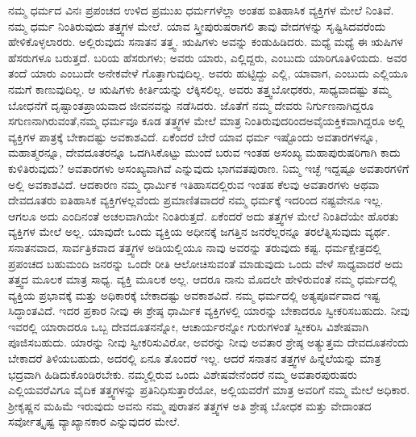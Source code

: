 ನಮ್ಮ ಧರ್ಮದ ವಿನಃ ಪ್ರಪಂಚದ ಉಳಿದ ಪ್ರಮುಖ ಧರ್ಮಗಳೆಲ್ಲಾ ಅಂತಹ ಐತಿಹಾಸಿಕ ವ್ಯಕ್ತಿಗಳ ಮೇಲೆ ನಿಂತಿವೆ. ನಮ್ಮ ಧರ್ಮ ನಿಂತಿರುವುದು ತತ್ತ್ವಗಳ ಮೇಲೆ. ಯಾವ ಸ್ತ್ರೀಪುರುಷರಾಗಲಿ ತಾವು ವೇದಗಳನ್ನು ಸೃಷ್ಟಿಸಿದವರೆಂದು ಹೇಳಿಕೊಳ್ಳಲಾರರು. ಅಲ್ಲಿರುವುದು ಸನಾತನ ತತ್ತ್ವ. ಋಷಿಗಳು ಅವನ್ನು ಕಂಡುಹಿಡಿದರು. ಮಧ್ಯೆ ಮಧ್ಯೆ ಈ ಋಷಿಗಳ ಹೆಸರುಗಳೂ ಬರುತ್ತದೆ. ಬರಿಯ ಹೆಸರುಗಳು; ಅವರು ಯಾರು, ಎಲ್ಲಿದ್ದರು, ಎಂಬುದು ಯಾರಿಗೂ\break ತಿಳಿಯದು. ಅವರ ತಂದೆ ಯಾರು ಎಂಬುದೇ ಅನೇಕವೇಳೆ ಗೊತ್ತಾಗುವುದಿಲ್ಲ. ಅವರು ಹುಟ್ಟಿದ್ದು ಎಲ್ಲಿ, ಯಾವಾಗ, ಎಂಬುದು ಎಲ್ಲಿಯೂ ನಮಗೆ ಕಾಣುವುದಿಲ್ಲ. ಆ ಋಷಿಗಳು ಕೀರ್ತಿಯನ್ನು ಲೆಕ್ಕಿಸಲಿಲ್ಲ. ಅವರು ತತ್ತ್ವಬೋಧಕರು, ಸಾಧ್ಯವಾದಷ್ಟು ತಮ್ಮ ಬೋಧನೆಗೆ ದೃಷ್ಟಾಂತಪ್ರಾಯವಾದ ಜೀವನವನ್ನು ನಡೆಸಿದರು. ಜೊತೆಗೆ ನಮ್ಮ ದೇವರು ನಿರ್ಗುಣನಾಗಿದ್ದರೂ ಸಗುಣನಾಗಿರುವಂತೆ,\break ನಮ್ಮ ಧರ್ಮವೂ ಕೂಡ ತತ್ತ್ವಗಳ ಮೇಲೆ ಮಾತ್ರ ನಿಂತಿರುವುದರಿಂದ\break ಅವೈಯಕ್ತಿಕವಾಗಿದ್ದರೂ ಅಲ್ಲಿ ವ್ಯಕ್ತಿಗಳ ಪಾತ್ರಕ್ಕೆ ಬೇಕಾದಷ್ಟು ಅವಕಾಶವಿದೆ. ಏಕೆಂದರೆ ಬೇರೆ ಯಾವ ಧರ್ಮ ಇಷ್ಟೊಂದು ಅವತಾರಗಳನ್ನೂ, ಮಹಾತ್ಮರನ್ನೂ, ದೇವದೂತರನ್ನೂ ಒದಗಿಸಿಕೊಟ್ಟು ಮುಂದೆ ಬರುವ ಇಂತಹ ಅಸಂಖ್ಯ ಮಹಾಪುರುಷರಿಗಾಗಿ ಕಾದು ಕುಳಿತಿರುವುದು? ಅವತಾರಗಳು ಅಸಂಖ್ಯವಾಗಿವೆ ಎನ್ನುವುದು ಭಾಗವತಪುರಾಣ. ನಿಮ್ಮ ಇಚ್ಛೆ ಇದ್ದಷ್ಟೂ ಅವತಾರಗಳಿಗೆ ಅಲ್ಲಿ ಅವಕಾಶವಿದೆ. ಆದಕಾರಣ ನಮ್ಮ ಧಾರ್ಮಿಕ ಇತಿಹಾಸದಲ್ಲಿರುವ ಇಂತಹ ಕೆಲವು ಅವತಾರಗಳು ಅಥವಾ ದೇವದೂತರು ಐತಿಹಾಸಿಕ ವ್ಯಕ್ತಿಗಳಲ್ಲವೆಂದು ಪ್ರಮಾಣಿತವಾದರೆ ನಮ್ಮ ಧರ್ಮಕ್ಕೆ ಇದರಿಂದ ನಷ್ಟವೇನೂ ಇಲ್ಲ. ಆಗಲೂ ಅದು ಎಂದಿನಂತೆ ಅಚಲವಾಗಿಯೇ ನಿಂತಿರುತ್ತದೆ. ಏಕೆಂದರೆ ಅದು ತತ್ತ್ವಗಳ ಮೇಲೆ ನಿಂತಿದೆಯೇ ಹೊರತು ವ್ಯಕ್ತಿಗಳ ಮೇಲೆ ಅಲ್ಲ. ಯಾವುದೇ ಒಂದು ವ್ಯಕ್ತಿಯ ಅಧೀನಕ್ಕೆ ಜಗತ್ತಿನ ಜನರೆಲ್ಲರನ್ನೂ ತರಲೆತ್ನಿಸುವುದು ವ್ಯರ್ಥ. ಸನಾತನವಾದ, ಸಾರ್ವತ್ರಿಕವಾದ ತತ್ತ್ವಗಳ ಅಡಿಯಲ್ಲಿಯೂ ನಾವು ಅವರನ್ನು ತರುವುದು ಕಷ್ಟ. ಧರ್ಮಕ್ಷೇತ್ರದಲ್ಲಿ ಪ್ರಪಂಚದ ಬಹುಮಂದಿ ಜನರನ್ನು ಒಂದೇ ರೀತಿ ಆಲೋಚಿಸುವಂತೆ ಮಾಡುವುದು ಒಂದು ವೇಳೆ ಸಾಧ್ಯವಾದರೆ ಅದು ತತ್ತ್ವದ ಮೂಲಕ ಮಾತ್ರ ಸಾಧ್ಯ. ವ್ಯಕ್ತಿ ಮೂಲಕ ಅಲ್ಲ. ಆದರೂ ನಾನು ಮೊದಲೇ ಹೇಳಿರುವಂತೆ ನಮ್ಮ ಧರ್ಮದಲ್ಲಿ ವ್ಯಕ್ತಿಯ ಪ್ರಭಾವಕ್ಕೆ ಮತ್ತು ಅಧಿಕಾರಕ್ಕೆ ಬೇಕಾದಷ್ಟು ಅವಕಾಶವಿದೆ. ನಮ್ಮ ಧರ್ಮದಲ್ಲಿ ಅತ್ಯಪೂರ್ವವಾದ ಇಷ್ಟ ಸಿದ್ಧಾಂತವಿದೆ. ಇದರ ಪ್ರಕಾರ ನೀವು ಈ ಶ್ರೇಷ್ಠ ಧಾರ್ಮಿಕ ವ್ಯಕ್ತಿಗಳಲ್ಲಿ ಯಾರನ್ನು ಬೇಕಾದರೂ ಸ್ವೀಕರಿಸಬಹುದು. ನೀವು ಇವರಲ್ಲಿ ಯಾರಾದರೂ ಒಬ್ಬ ದೇವದೂತನನ್ನೋ, ಆಚಾರ್ಯರನ್ನೋ ಗುರುಗಳಂತೆ ಸ್ವೀಕರಿಸಿ ವಿಶೇಷವಾಗಿ ಪೂಜಿಸಬಹುದು. ಯಾರನ್ನು ನೀವು ಸ್ವೀಕರಿಸುವಿರೋ, ಅವರನ್ನು ನೀವು ಅವತಾರ ಶ್ರೇಷ್ಠ ಅತ್ಯುತ್ತಮ ದೇವದೂತನೆಂದು ಬೇಕಾದರೆ ತಿಳಿಯಬಹುದು, ಅದರಲ್ಲಿ ಏನೂ ತೊಂದರೆ ಇಲ್ಲ. ಆದರೆ ಸನಾತನ ತತ್ತ್ವಗಳ ಹಿನ್ನೆಲೆಯನ್ನು ಮಾತ್ರ ಭದ್ರವಾಗಿ ಹಿಡಿದುಕೊಂಡಿರಬೇಕು. ನಮ್ಮಲ್ಲಿರುವ ಒಂದು ವಿಶೇಷವೇನೆಂದರೆ ನಮ್ಮ ಅವತಾರಪುರುಷರು ಎಲ್ಲಿಯವರೆವಿಗೂ ವೈದಿಕ ತತ್ತ್ವಗಳನ್ನು ಪ್ರತಿನಿಧಿಸುತ್ತಾರೆಯೋ, ಅಲ್ಲಿಯವರೆಗೆ ಮಾತ್ರ ಅವರಿಗೆ ನಮ್ಮ ಮೇಲೆ ಅಧಿಕಾರ. ಶ‍್ರೀಕೃಷ್ಣನ ಮಹಿಮೆ ಇರುವುದು ಅವನು ನಮ್ಮ ಪುರಾತನ ತತ್ತ್ವಗಳ ಅತಿ ಶ್ರೇಷ್ಠ ಬೋಧಕ ಮತ್ತು ವೇದಾಂತದ ಸರ್ವೋತ್ಕೃಷ್ಟ ವ್ಯಾಖ್ಯಾನಕಾರ ಎನ್ನುವುದರ ಮೇಲೆ.

